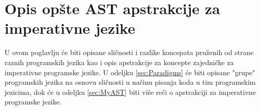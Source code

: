 \chapter{Opis opšte AST apstrakcije za imperativne jezike}
\label{chp:MyAST}

U ovom poglavlju će biti opisane sličnosti i razlike koncepata pruženih od strane raznih programskih jezika kao i opis apstrakcije za koncepte zajedničke za imperativne programske jezike. U odeljku \ref{sec:Paradigms} će biti opisane "grupe" programskih jezika na osnovu sličnosti u načinu pisanja koda u tim programskim jezicima, dok će u odeljku \ref{sec:MyAST} biti više reči o apstrakciji za imperativne programske jezike.



